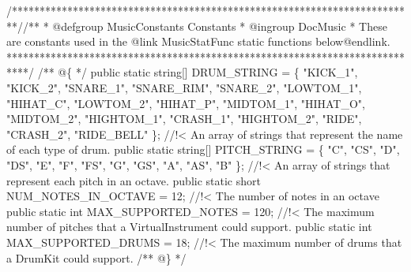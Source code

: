 \begin{DoxyCodeInclude}
    \textcolor{comment}{/*************************************************************************/}\textcolor{comment}{/** }
\textcolor{comment}{    * @defgroup MusicConstants Constants}
\textcolor{comment}{    * @ingroup DocMusic}
\textcolor{comment}{    * These are constants used in the @link MusicStatFunc static functions below@endlink.}
\textcolor{comment}{    ****************************************************************************/}\textcolor{comment}{}
\textcolor{comment}{    /** @\{ */}
    \textcolor{keyword}{public} \textcolor{keyword}{static} \textcolor{keywordtype}{string}[] DRUM\_STRING =
        \{ \textcolor{stringliteral}{"KICK\_1"}, \textcolor{stringliteral}{"KICK\_2"}, \textcolor{stringliteral}{"SNARE\_1"}, \textcolor{stringliteral}{"SNARE\_RIM"}, \textcolor{stringliteral}{"SNARE\_2"}, \textcolor{stringliteral}{"LOWTOM\_1"},
        \textcolor{stringliteral}{"HIHAT\_C"}, \textcolor{stringliteral}{"LOWTOM\_2"}, \textcolor{stringliteral}{"HIHAT\_P"}, \textcolor{stringliteral}{"MIDTOM\_1"}, \textcolor{stringliteral}{"HIHAT\_O"}, \textcolor{stringliteral}{"MIDTOM\_2"},
        \textcolor{stringliteral}{"HIGHTOM\_1"}, \textcolor{stringliteral}{"CRASH\_1"}, \textcolor{stringliteral}{"HIGHTOM\_2"}, \textcolor{stringliteral}{"RIDE"}, \textcolor{stringliteral}{"CRASH\_2"}, \textcolor{stringliteral}{"RIDE\_BELL"} \}; \textcolor{comment}{//!< An array of strings
       that represent the name of each type of drum.}
\textcolor{comment}{}    \textcolor{keyword}{public} \textcolor{keyword}{static} \textcolor{keywordtype}{string}[] PITCH\_STRING = \{ \textcolor{stringliteral}{"C"}, \textcolor{stringliteral}{"CS"}, \textcolor{stringliteral}{"D"}, \textcolor{stringliteral}{"DS"}, \textcolor{stringliteral}{"E"}, \textcolor{stringliteral}{"F"}, \textcolor{stringliteral}{"FS"}, \textcolor{stringliteral}{"G"}, \textcolor{stringliteral}{"GS"}, \textcolor{stringliteral}{"A"}, \textcolor{stringliteral}{"AS"}, \textcolor{stringliteral}{"B"}
       \}; \textcolor{comment}{//!< An array of strings that represent each pitch in an octave.}
\textcolor{comment}{}    \textcolor{keyword}{public} \textcolor{keyword}{static} \textcolor{keywordtype}{short} NUM\_NOTES\_IN\_OCTAVE = 12; \textcolor{comment}{//!< The number of notes in an octave}
\textcolor{comment}{}    \textcolor{keyword}{public} \textcolor{keyword}{static} \textcolor{keywordtype}{int} MAX\_SUPPORTED\_NOTES = 120; \textcolor{comment}{//!< The maximum number of pitches that a
       VirtualInstrument could support.}
\textcolor{comment}{}    \textcolor{keyword}{public} \textcolor{keyword}{static} \textcolor{keywordtype}{int} MAX\_SUPPORTED\_DRUMS = 18; \textcolor{comment}{//!< The maximum number of drums that a DrumKit could
       support.}
\textcolor{comment}{}\textcolor{comment}{    /** @\} */}


\end{DoxyCodeInclude}
